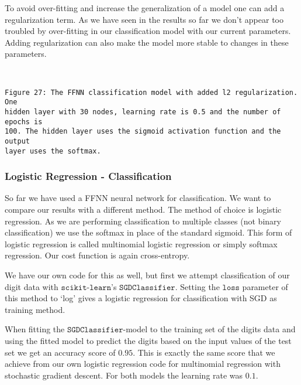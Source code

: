 \documentclass[11pt]{article}
\begin{document}
To avoid over-fitting and increase the generalization of a model one can
add a regularization term. As we have seen in the results so far we
don't appear too troubled by over-fitting in our classification model
with our current parameters. Adding regularization can also make the
model more stable to changes in these parameters.

    \begin{center}
    \end{center}
    { \hspace*{\fill} \\}
    
    \begin{Verbatim}[commandchars=\\\{\}]
Figure 27: The FFNN classification model with added l2 regularization. One
hidden layer with 30 nodes, learning rate is 0.5 and the number of epochs is 
100. The hidden layer uses the sigmoid activation function and the output
layer uses the softmax.
    \end{Verbatim}

    \hypertarget{logistic-regression---classification}{%
\subsubsection{Logistic Regression -
Classification}\label{logistic-regression---classification}}

So far we have used a FFNN neural network for classification. We want to
compare our results with a different method. The method of choice is
logistic regression. As we are performing classification to multiple
classes (not binary classification) we use the softmax in place of the
standard sigmoid. This form of logistic regression is called multinomial
logistic regression or simply softmax regression. Our cost function is
again cross-entropy.

We have our own code for this as well, but first we attempt
classification of our digit data with \(\texttt{scikit-learn}\)'s
\(\texttt{SGDClassifier}\). Setting the \(\texttt{loss}\) parameter of
this method to `log' gives a logistic regression for classification with
SGD as training method.

When fitting the \(\texttt{SGDClassifier}\)-model to the training set of
the digits data and using the fitted model to predict the digits based
on the input values of the test set we get an accuracy score of
\(0.95\). This is exactly the same score that we achieve from our own
logistic regression code for multinomial regression with stochastic
gradient descent. For both models the learning rate was \(0.1\).
\end{document}
